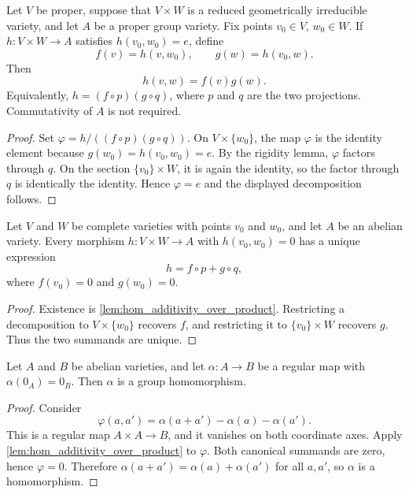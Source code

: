 \begin{lemma}
  \label{lem:hom_additivity_over_product}
  \leanok
  Let \(V\) be proper, suppose that \(V\times W\) is a reduced geometrically
  irreducible variety, and let \(A\) be a proper group variety.  Fix points
  \(v_0\in V\), \(w_0\in W\).  If \(h\colon V\times W\to A\) satisfies
  \(h(v_0,w_0)=e\), define
  \[
    f(v)=h(v,w_0),\qquad g(w)=h(v_0,w).
  \]
  Then
  \[
    h(v,w)=f(v)g(w).
  \]
  Equivalently, \(h=(f\circ p)(g\circ q)\), where \(p\) and \(q\) are the two
  projections.  Commutativity of \(A\) is not required.
\end{lemma}
\begin{proof}
  \leanok
  Set \(\varphi=h/((f\circ p)(g\circ q))\).  On \(V\times\{w_0\}\), the map
  \(\varphi\) is the identity element because \(g(w_0)=h(v_0,w_0)=e\).  By the
  rigidity lemma, \(\varphi\) factors through \(q\).  On the section
  \(\{v_0\}\times W\), it is again the identity, so the factor through \(q\) is
  identically the identity.  Hence \(\varphi=e\) and the displayed decomposition
  follows.
\end{proof}

\begin{corollary}
  \label{cor:hom_additivity_over_product_unique}
  Let \(V\) and \(W\) be complete varieties with points \(v_0\) and \(w_0\), and let
  \(A\) be an abelian variety.  Every morphism \(h\colon V\times W\to A\) with
  \(h(v_0,w_0)=0\) has a unique expression
  \[
    h=f\circ p+g\circ q,
  \]
  where \(f(v_0)=0\) and \(g(w_0)=0\).
\end{corollary}
\begin{proof}
  Existence is \cref{lem:hom_additivity_over_product}.  Restricting a decomposition to
  \(V\times\{w_0\}\) recovers \(f\), and restricting it to
  \(\{v_0\}\times W\) recovers \(g\).  Thus the two summands are unique.
\end{proof}

\begin{lemma}
  \label{lem:av_regular_map_is_hom}
  \leanok
  Let \(A\) and \(B\) be abelian varieties, and let \(\alpha\colon A\to B\) be a
  regular map with \(\alpha(0_A)=0_B\).  Then \(\alpha\) is a group homomorphism.
\end{lemma}
\begin{proof}
  \leanok
  Consider
  \[
    \varphi(a,a')=\alpha(a+a')-\alpha(a)-\alpha(a').
  \]
  This is a regular map \(A\times A\to B\), and it vanishes on both coordinate
  axes.  Apply \cref{lem:hom_additivity_over_product} to \(\varphi\).  Both canonical
  summands are zero, hence \(\varphi=0\).  Therefore
  \(\alpha(a+a')=\alpha(a)+\alpha(a')\) for all \(a,a'\), so \(\alpha\) is a
  homomorphism.
\end{proof}


